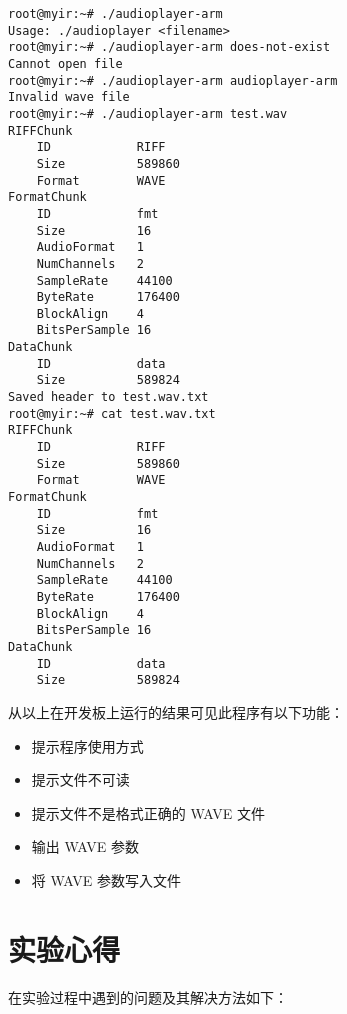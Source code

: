 \begin{multicols}{2}
\setlength{\columnseprule}{0.4pt}
\begin{verbatim}
root@myir:~# ./audioplayer-arm 
Usage: ./audioplayer <filename>
root@myir:~# ./audioplayer-arm does-not-exist
Cannot open file
root@myir:~# ./audioplayer-arm audioplayer-arm 
Invalid wave file
root@myir:~# ./audioplayer-arm test.wav
RIFFChunk
    ID            RIFF
    Size          589860
    Format        WAVE
FormatChunk
    ID            fmt 
    Size          16
    AudioFormat   1
    NumChannels   2
    SampleRate    44100
    ByteRate      176400
    BlockAlign    4
    BitsPerSample 16
DataChunk
    ID            data
    Size          589824
Saved header to test.wav.txt
root@myir:~# cat test.wav.txt 
RIFFChunk
    ID            RIFF
    Size          589860
    Format        WAVE
FormatChunk
    ID            fmt 
    Size          16
    AudioFormat   1
    NumChannels   2
    SampleRate    44100
    ByteRate      176400
    BlockAlign    4
    BitsPerSample 16
DataChunk
    ID            data
    Size          589824
\end{verbatim}
\end{multicols}

从以上在开发板上运行的结果可见此程序有以下功能：
\begin{itemize}
    \item 提示程序使用方式
    \item 提示文件不可读
    \item 提示文件不是格式正确的 WAVE 文件
    \item 输出 WAVE 参数
    \item 将 WAVE 参数写入文件
\end{itemize}

\newpage

\section{实验心得}\label{sec:problem}

在实验过程中遇到的问题及其解决方法如下：

